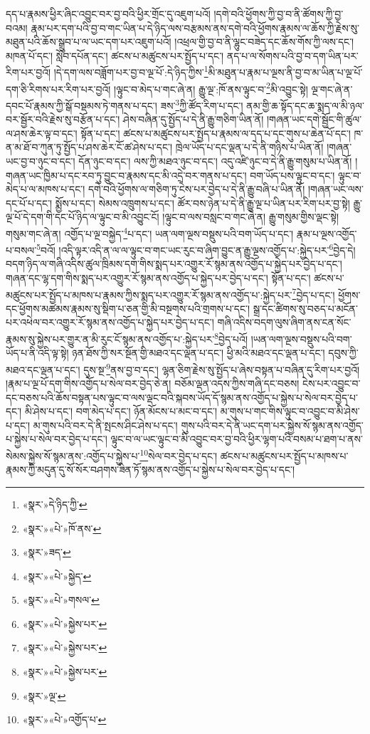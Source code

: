 དད་པ་རྣམས་ཕྱིར་ཞིང་འབྱུང་བར་བྱ་བའི་ཕྱིར་གྲོང་དུ་འཇུག་པའོ། །དགེ་བའི་ཕྱོགས་ཀྱི་བྱ་བ་ནི་ཚོགས་ཀྱི་བྱ་བའམ། རྣམ་པར་དག་པའི་བྱ་བ་གང་ཡིན་པ་དེ་ཉིད་ལས་བརྩམས་ནས་དགེ་བའི་ཕྱོགས་རྣམས་ལ་ཆོས་ཀྱི་རྗེས་སུ་མཐུན་པའི་ཆོས་སྒྲུབ་པ་ལ་ཡང་དག་པར་འཇུག་པའོ། །འཕྲལ་གྱི་བྱ་བ་ནི་ལྷུང་བཟེད་དང་ཆོས་གོས་ཀྱི་ལས་དང་། མཁན་པོ་དང་། སློབ་དཔོན་དང་། ཚངས་པ་མཚུངས་པར་སྤྱོད་པ་དང་། ནད་པ་ལ་སོགས་པའི་བྱ་བ་དག་ཡིན་པར་རིག་པར་བྱའོ། །དེ་དག་ལས་བཟློག་པར་བྱ་བ་ལྔ་པོ་:དེ་ཉིད་ཀྱིས་\footnote{«སྣར་»དེ་ཉིད་ཀྱི་}མི་མཐུན་པ་རྣམ་པ་ལྔས་ནི་བྱ་བ་མ་ཡིན་པ་ལྔ་པོ་དག་ཅི་རིགས་པར་རིག་པར་བྱའོ། །ལྟུང་བ་མེད་པ་གང་ཞེ་ན། རྒྱུ་ལྔ་:ཁོ་ནས་ལྟུང་བ་\footnote{«སྣར་»«པེ་»ཁོ་ནས་}མི་འབྱུང་སྟེ། ལྔ་གང་ཞེ་ན་དབང་པོ་རྣམས་ཀྱི་སྒོ་བསྡམས་ཏེ་གནས་པ་དང་། ཟས་\footnote{«སྣར་»ཟད་}ཀྱི་ཚོད་རིག་པ་དང་། ནམ་གྱི་ཆ་སྟོད་དང་ཆ་སྨད་ལ་མི་ཉལ་བར་སྦྱོར་བའི་རྗེས་སུ་བརྩོན་པ་དང་། ཤེས་བཞིན་དུ་སྤྱོད་པ་དེ་ནི་རྒྱུ་གཅིག་ཡིན་ནོ། །གཞན་ཡང་དགེ་སྦྱོང་གི་ཚུལ་ལ་ཤས་ཆེར་ལྟ་བ་དང་། སྟོན་པ་དང་། ཚངས་པ་མཚུངས་པར་སྤྱོད་པ་རྣམས་ལ་དད་པ་དང་གུས་པ་ཆེན་པོ་དང་། ཁ་ན་མ་ཐོ་བ་ཀུན་ཏུ་སྤྱོད་པ་ཤས་ཆེར་ངོ་ཚ་ཤེས་པ་དང་། ཁྲེལ་ཡོད་པ་དང་ལྡན་པ་དེ་ནི་གཉིས་པ་ཡིན་ནོ། །གཞན་ཡང་བྱ་བ་ཉུང་བ་དང་། དོན་ཉུང་བ་དང་། ལས་ཀྱི་མཐའ་ཉུང་བ་དང་། འདུ་འཛི་ཉུང་བ་དེ་ནི་རྒྱུ་གསུམ་པ་ཡིན་ནོ། །གཞན་ཡང་ཁྱིམ་པ་དང་རབ་ཏུ་བྱུང་བ་རྣམས་དང་མི་འདྲེ་བར་གནས་པ་དང་། བག་ཡོད་པས་ལྟུང་བ་དང་། ལྟུང་བ་མེད་པ་ལ་མཁས་པ་དང་། དགེ་བའི་ཕྱོགས་ལ་གཅིག་ཏུ་ངེས་པར་བྱེད་པ་དེ་ནི་རྒྱུ་བཞི་པ་ཡིན་ནོ། །གཞན་ཡང་ལས་དང་པོ་པ་དང་། སྨྱོས་པ་དང་། སེམས་འཁྲུགས་པ་དང་། ཚོར་བས་ཉེན་པ་དེ་ནི་རྒྱུ་ལྔ་པ་ཡིན་པར་རིག་པར་བྱ་སྟེ། རྒྱུ་ལྔ་པོ་དེ་དག་གི་དང་པོ་ཉིད་ལ་ལྟུང་བ་མི་འབྱུང་ངོ། །ལྟུང་བ་ལས་བསླང་བ་གང་ཞེ་ན། རྒྱུ་གསུམ་གྱིས་ལྡང་སྟེ། གསུམ་གང་ཞེ་ན། འགྱོད་པ་ལྔ་བསྐྱེད་\footnote{«སྣར་»«པེ་»སྐྱེད་}པ་དང་། ཡན་ལག་ལྔས་བསྡུས་པའི་བག་ཡོད་པ་དང་། རྣམ་པ་ལྔས་འགྱོད་པ་བསལ་\footnote{«སྣར་»«པེ་»གསལ་}བའོ། །འདི་ལྟར་འདི་ན་ལ་ལ་ལྟུང་བ་གང་ཡང་རུང་བ་ཞིག་བྱུང་ན་རྒྱུ་ལྔས་འགྱོད་པ་:སྐྱེད་པར་\footnote{«སྣར་»«པེ་»སྐྱེས་པར་}བྱེད་དེ། བདག་ཉིད་ལ་གཞི་འདིས་ཚུལ་ཁྲིམས་དག་གིས་སྨད་པར་འགྱུར་རོ་སྙམ་ནས་འགྱོད་པ་སྐྱེད་པར་བྱེད་པ་དང་། གཞན་དང་ལྷ་དག་གིས་སྨད་པར་འགྱུར་རོ་སྙམ་ནས་འགྱོད་པ་སྐྱེད་པར་བྱེད་པ་དང་། སྟོན་པ་དང་། ཚངས་པ་མཚུངས་པར་སྤྱོད་པ་མཁས་པ་རྣམས་ཀྱིས་སྨད་པར་འགྱུར་རོ་སྙམ་ནས་འགྱོད་པ་:སྐྱེད་པར་\footnote{«སྣར་»«པེ་»སྐྱེས་པར་}བྱེད་པ་དང་། ཕྱོགས་དང་ཕྱོགས་མཚམས་རྣམས་སུ་སྡིག་པ་ཅན་གྱི་མི་བསྔགས་པའི་གྲགས་པ་དང་། སྒྲ་དང་ཚིགས་སུ་བཅད་པ་མངོན་པར་འཕེལ་བར་འགྱུར་རོ་སྙམ་ནས་འགྱོད་པ་སྐྱེད་པར་བྱེད་པ་དང་། གཞི་འདིས་བདག་ལུས་ཞིག་ནས་ངན་སོང་རྣམས་སུ་སྐྱེས་པར་གྱུར་ན་མི་རུང་ངོ་སྙམ་ནས་འགྱོད་པ་:སྐྱེད་པར་\footnote{«སྣར་»«པེ་»སྐྱེས་པར་}བྱེད་པའོ། །ཡན་ལག་ལྔས་བསྡུས་པའི་བག་ཡོད་པ་ནི་འདི་ལྟ་སྟེ། ཉན་ཐོས་ཀྱི་སར་སྔོན་གྱི་མཐའ་དང་ལྡན་པ་དང་། ཕྱི་མའི་མཐའ་དང་ལྡན་པ་དང་། དབུས་ཀྱི་མཐའ་དང་ལྡན་པ་དང་། དུས་སྔ་\footnote{«སྣར་»ལྔ་}ནས་བྱ་བ་དང་། ལྷན་ཅིག་རྗེས་སུ་སྤྱོད་པ་ཞེས་བསྟན་པ་བཞིན་དུ་རིག་པར་བྱའོ། །རྣམ་པ་ལྔ་པོ་དག་གིས་འགྱོད་པ་སེལ་བར་བྱེད་ཅེ་ན། བཅོམ་ལྡན་འདས་ཀྱིས་གཞི་དང་བཅས། ངེས་པར་འབྱུང་བ་དང་བཅས་པའི་ཆོས་བསྟན་པས་ལྟུང་བ་ལས་ལྡང་བའི་སྐབས་ཡོད་དོ་སྙམ་ནས་འགྱོད་པ་སྐྱེས་པ་སེལ་བར་བྱེད་པ་དང་། མི་ཤེས་པ་དང་། བག་མེད་པ་དང་། ཉོན་མོངས་པ་མང་བ་དང་། མ་གུས་པ་གང་གིས་ལྟུང་བ་འབྱུང་བ་མི་ཤེས་པ་དང་། མ་གུས་པའི་བར་དེ་ནི་སྤངས་ཤིང་ཤེས་པ་དང་། གུས་པའི་བར་དེ་ནི་ཡང་དག་པར་སྐྱེས་སོ་སྙམ་ནས་འགྱོད་པ་སྐྱེས་པ་སེལ་བར་བྱེད་པ་དང་། ལྟུང་བ་ལ་ཡང་ལྟུང་བ་མི་འབྱུང་བར་བྱ་བའི་ཕྱིར་ལྷག་པའི་བསམ་པ་ཐག་པ་ནས་སེམས་སྐྱེས་སོ་སྙམ་ནས་:འགྱོད་པ་སྐྱེས་པ་\footnote{«སྣར་»«པེ་»འགྱོད་པ་}སེལ་བར་བྱེད་པ་དང་། ཚངས་པ་མཚུངས་པར་སྤྱོད་པ་མཁས་པ་རྣམས་ཀྱི་མདུན་དུ་སོ་སོར་བཤགས་ཟིན་ཏོ་སྙམ་ནས་འགྱོད་པ་སྐྱེས་པ་སེལ་བར་བྱེད་པ་དང་། 